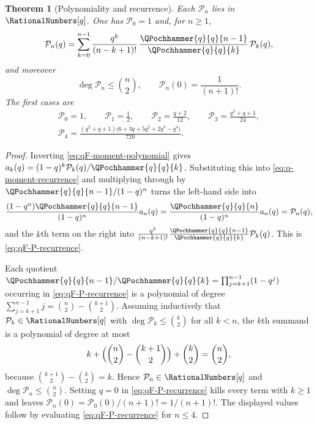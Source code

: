 \documentclass[11pt,a4paper,oneside,openany]{book}
\newtheorem{theorem}{Theorem}[chapter]
\theoremstyle{definition}
\theoremstyle{remark}
\begin{document}
\begin{theorem}[Polynomiality and recurrence]\label{thm:qF-moment-polynomial}
Each $\mathcal P_n$ lies in $\RationalNumbers[q]$.  One has $\mathcal P_0=1$ and, for $n\ge1$,
\begin{equation}\label{eq:qF-P-recurrence}
 \mathcal P_n(q)=\sum_{k=0}^{n-1}
 \frac{q^{k}}{(n-k+1)!}\,\frac{\QPochhammer{q}{q}{n-1}}{\QPochhammer{q}{q}{k}}\,\mathcal P_k(q),
\end{equation}
and moreover
\begin{equation}\label{eq:qF-P-degree}
 \deg\mathcal P_n\le\binom n2,
 \qquad
 \mathcal P_n(0)=\frac1{(n+1)!}.
\end{equation}
The first cases are
\begin{gather*}
 \mathcal P_0=1,\qquad
 \mathcal P_1=\frac12,\qquad
 \mathcal P_2=\frac{q+2}{12},\qquad
 \mathcal P_3=\frac{q^2+q+1}{24},\\
 \mathcal P_4=\frac{(q^2+q+1)\bigl(6+3q+5q^2+2q^3-q^4\bigr)}{720}.
\end{gather*}
\end{theorem}

\begin{proof}
Inverting \eqref{eq:qF-moment-polynomial} gives
$a_k(q)=(1-q)^k\mathcal P_k(q)/\QPochhammer{q}{q}{k}$.  Substituting this into
\eqref{eq:q-moment-recurrence} and multiplying through by
$\QPochhammer{q}{q}{n-1}/(1-q)^n$ turns the left-hand side into
\[
 \frac{(1-q^n)\QPochhammer{q}{q}{n-1}}{(1-q)^n}a_n(q)
 =\frac{\QPochhammer{q}{q}{n}}{(1-q)^n}a_n(q)
 =\mathcal P_n(q),
\]
and the $k$th term on the right into
$\frac{q^k}{(n-k+1)!}\frac{\QPochhammer{q}{q}{n-1}}{\QPochhammer{q}{q}{k}}\mathcal P_k(q)$.  This is
\eqref{eq:qF-P-recurrence}.

Each quotient $\QPochhammer{q}{q}{n-1}/\QPochhammer{q}{q}{k}=\prod_{j=k+1}^{n-1}(1-q^j)$ occurring in
\eqref{eq:qF-P-recurrence} is a polynomial of degree
$\sum_{j=k+1}^{n-1}j=\binom n2-\binom{k+1}2$.  Assuming inductively that
$\mathcal P_k\in\RationalNumbers[q]$ with $\deg\mathcal P_k\le\binom k2$ for all $k<n$, the
$k$th summand is a polynomial of degree at most
\[
 k+\Bigl(\binom n2-\binom{k+1}2\Bigr)+\binom k2
 =\binom n2,
\]
because $\binom{k+1}2-\binom k2=k$.  Hence $\mathcal P_n\in\RationalNumbers[q]$ and
$\deg\mathcal P_n\le\binom n2$.  Setting $q=0$ in \eqref{eq:qF-P-recurrence}
kills every term with $k\ge1$ and leaves
$\mathcal P_n(0)=\mathcal P_0(0)/(n+1)!=1/(n+1)!$.  The displayed values follow
by evaluating \eqref{eq:qF-P-recurrence} for $n\le4$.
\end{proof}
\end{document}
